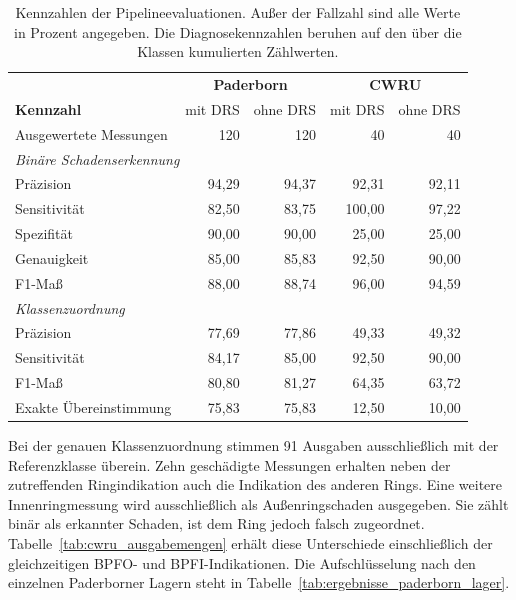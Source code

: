 \begin{table}[htbp]
  \centering
  \caption{Kennzahlen der Pipelineevaluationen. Außer der Fallzahl sind alle
    Werte in Prozent angegeben. Die Diagnosekennzahlen beruhen auf den
    über die Klassen kumulierten Zählwerten.}
  \label{tab:pipeline_kennzahlen}
  \small
  \begin{tabular}{lrrrr}
    \hline
    & \multicolumn{2}{c}{\textbf{Paderborn}} &
      \multicolumn{2}{c}{\textbf{CWRU}} \\
    \textbf{Kennzahl} & mit DRS & ohne DRS & mit DRS & ohne DRS \\
    \hline
    Ausgewertete Messungen & 120 & 120 & 40 & 40 \\
    \hline\multicolumn{5}{l}{\textit{Binäre Schadenserkennung}} \\
    Präzision & 94,29 & 94,37 & 92,31 & 92,11 \\
    Sensitivität & 82,50 & 83,75 & 100,00 & 97,22 \\
    Spezifität & 90,00 & 90,00 & 25,00 & 25,00 \\
    Genauigkeit & 85,00 & 85,83 & 92,50 & 90,00 \\
    F1-Maß & 88,00 & 88,74 & 96,00 & 94,59 \\
    \hline\multicolumn{5}{l}{\textit{Klassenzuordnung}} \\
    Präzision & 77,69 & 77,86 & 49,33 & 49,32 \\
    Sensitivität & 84,17 & 85,00 & 92,50 & 90,00 \\
    F1-Maß & 80,80 & 81,27 & 64,35 & 63,72 \\
    Exakte Übereinstimmung & 75,83 & 75,83 & 12,50 & 10,00 \\
    \hline
  \end{tabular}
\end{table}

Bei der genauen Klassenzuordnung stimmen 91 Ausgaben ausschließlich mit der
Referenzklasse überein. Zehn geschädigte Messungen erhalten neben der
zutreffenden Ringindikation auch die Indikation des anderen Rings.
Eine weitere Innenringmessung wird ausschließlich als Außenringschaden
ausgegeben. Sie zählt binär als erkannter Schaden, ist dem Ring jedoch
falsch zugeordnet. Tabelle~\ref{tab:cwru_ausgabemengen} erhält diese
Unterschiede einschließlich der gleichzeitigen BPFO- und BPFI-Indikationen.
Die Aufschlüsselung nach den einzelnen Paderborner Lagern steht in
Tabelle~\ref{tab:ergebnisse_paderborn_lager}.


